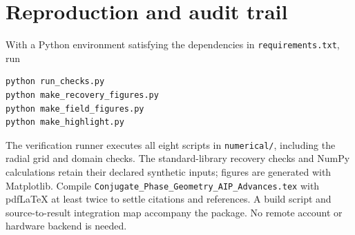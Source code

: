 \documentclass[aip,adv,reprint,onecolumn,amsmath,amssymb]{revtex4-2}
\begin{document}
\section{Reproduction and audit trail}
With a Python environment satisfying the dependencies in \texttt{requirements.txt}, run
\begin{verbatim}
python run_checks.py
python make_recovery_figures.py
python make_field_figures.py
python make_highlight.py
\end{verbatim}
The verification runner executes all eight scripts in \texttt{numerical/}, including the radial grid and domain checks. The standard-library recovery checks and NumPy calculations retain their declared synthetic inputs; figures are generated with Matplotlib. Compile \texttt{Conjugate\_Phase\_Geometry\_AIP\_Advances.tex} with pdfLaTeX at least twice to settle citations and references. A build script and source-to-result integration map accompany the package. No remote account or hardware backend is needed.
\end{document}
